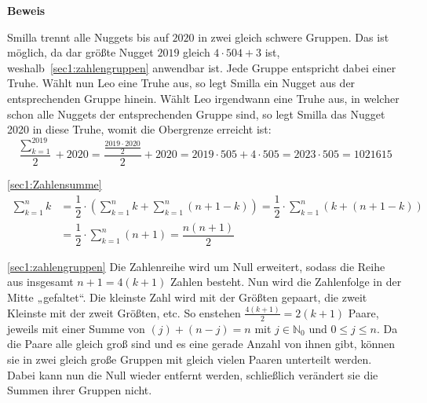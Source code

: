 \documentclass[10pt, a4paper]{amsart}
\makeatletter
\renewcommand\proofname{Beweis}
\renewenvironment{proof}[1][\proofname]{\par
\pushQED{\qed}%
\normalfont \topsep6\p@\@plus6\p@\relax
\trivlist
\item\relax
{\bfseries#1}\hspace\labelsep\ignorespaces
}{%
\popQED\endtrivlist\@endpefalse
}
\newenvironment{proof_thm}[1]{
\begin{proof}[\proofname~(#1)]}{\end{proof}}
\makeatother
\begin{document}
\begin{proof}
  Smilla trennt alle Nuggets bis auf $2020$ in zwei gleich schwere Gruppen.
  Das ist möglich, da dar größte Nugget $2019$ gleich $4\cdot504 + 3$ ist,
  weshalb~\autoref{sec1:zahlengruppen} anwendbar ist. Jede Gruppe entspricht
  dabei einer Truhe. Wählt nun Leo eine Truhe aus, so legt Smilla ein Nugget aus
  der entsprechenden Gruppe hinein. Wählt Leo irgendwann eine Truhe aus, in
  welcher schon alle Nuggets der entsprechenden Gruppe sind, so legt Smilla das
  Nugget 2020 in diese Truhe, womit die Obergrenze erreicht ist:
  \begin{equation*}
    \frac{\sum_{k=1}^{2019}}{2}
    + 2020 = \frac{\frac{2019\cdot2020}{2}}{2} + 2020 = 2019\cdot505 + 4\cdot505 =
    2023\cdot505 = 1021615
  \end{equation*}
\end{proof}
\begin{proof_thm}{\autoref{sec1:Zahlensumme}}
  \begin{align*}
    \sum^{n}_{k=1}k&=\dfrac{1}{2}\cdot\left( \sum^{n}_{k=1}k +
                     \sum^{n}_{k=1}(n+1-k)\right) = \dfrac{1}{2}\cdot\sum^{n}_{k=1}(k+(n+1-k))\\
                   &=\dfrac{1}{2}\cdot\sum^{n}_{k=1}(n+1) = \dfrac{n(n+1)}{2}
  \end{align*}
\end{proof_thm}
\begin{proof_thm}{\autoref{sec1:zahlengruppen}}
  Die Zahlenreihe wird um Null erweitert, sodass die Reihe aus insgesamt
  $n+1=4(k+1)$ Zahlen besteht. Nun wird die Zahlenfolge in der Mitte „gefaltet“.
  Die kleinste Zahl wird mit der Größten gepaart, die zweit Kleinste mit der
  zweit Größten, etc. So enstehen $\frac{4(k+1)}{2}=2(k+1)$ Paare, jeweils mit
  einer Summe von $(j)+(n-j) = n$ mit $j∈ℕ_0$ und $0\leq j \leq n$. Da die Paare
  alle gleich groß sind und es eine gerade Anzahl von ihnen gibt, können sie in
  zwei gleich große Gruppen mit gleich vielen Paaren unterteilt werden. Dabei
  kann nun die Null wieder entfernt werden, schließlich verändert sie die Summen
  ihrer Gruppen nicht.
\end{proof_thm}
\end{document}
